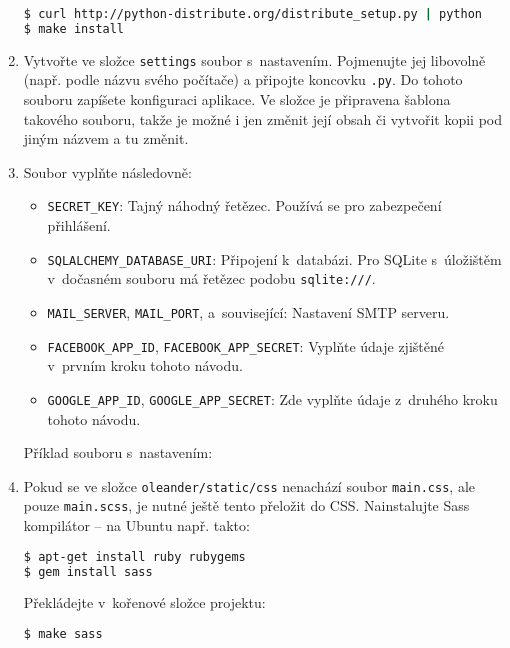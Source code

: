 \documentclass[12pt,oneside,final]{fithesis2}
\begin{document}
\begin{enumerate}
        \begin{lstlisting}[language=bash]
$ curl http://python-distribute.org/distribute_setup.py | python
$ make install
        \end{lstlisting}

    \item Vytvořte ve složce {\tt settings} soubor s~nastavením. Pojmenujte jej libovolně (např. podle názvu svého počítače) a připojte koncovku {\tt .py}. Do tohoto souboru zapíšete konfiguraci aplikace. Ve složce je připravena šablona takového souboru, takže je možné i jen změnit její obsah či vytvořit kopii pod jiným názvem a tu změnit.

    \item Soubor vyplňte následovně:

        \begin{itemize}
            \item {\tt SECRET\_KEY}: Tajný náhodný řetězec. Používá se pro zabezpečení přihlášení.
            \item {\tt SQLALCHEMY\_DATABASE\_URI}: Připojení k~databázi. Pro SQLite s~úložištěm v~dočasném souboru má řetězec podobu {\tt sqlite:///}.
            \item {\tt MAIL\_SERVER}, {\tt MAIL\_PORT}, a~sou\-vi\-se\-jí\-cí: Nastavení SMTP serveru.
            \item {\tt FACEBOOK\_APP\_ID}, {\tt FACEBOOK\_APP\_SECRET}: Vyplňte údaje zjištěné v~prvním kroku tohoto návodu.
            \item {\tt GOOGLE\_APP\_ID}, {\tt GOOGLE\_APP\_SECRET}: Zde vyplňte údaje z~dru\-hé\-ho kro\-ku tohoto návodu.
        \end{itemize}

    Příklad souboru s~nastavením:

        

    \item Pokud se ve složce {\tt oleander/static/css} nenachází soubor {\tt main.css}, ale pouze {\tt main.scss}, je nutné ještě tento přeložit do CSS. Nainstalujte Sass kompilátor -- na Ubuntu např. takto:

        \begin{lstlisting}[language=bash]
$ apt-get install ruby rubygems
$ gem install sass
        \end{lstlisting}

    Překládejte v~kořenové složce projektu:

        \begin{lstlisting}[language=bash]
$ make sass
        \end{lstlisting}


\end{enumerate}
\end{document}
